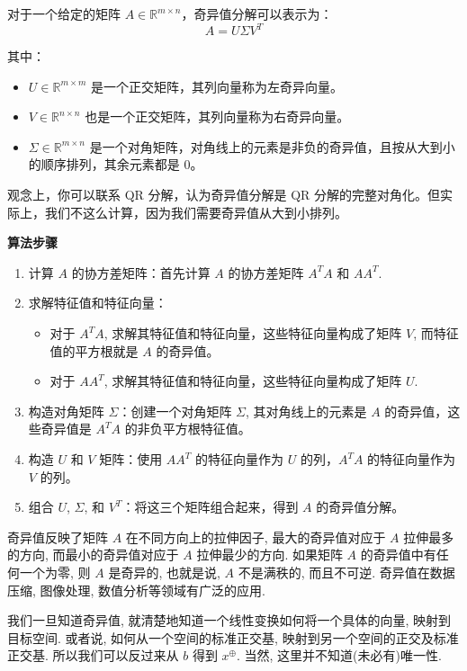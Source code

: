 \documentclass[a4paper]{ctexart}
\begin{document}
{对于一个给定的矩阵 \( A \in \mathbb{R}^{m \times n} \)，奇异值分解可以表示为：
\[ 
  A = U \Sigma V^T 
\]

其中：
\begin{itemize}
  \item \( U \in \mathbb{R}^{m \times m} \) 是一个正交矩阵，其列向量称为左奇异向量。
  \item \( V \in \mathbb{R}^{n \times n} \) 也是一个正交矩阵，其列向量称为右奇异向量。
  \item \( \Sigma \in \mathbb{R}^{m \times n} \) 是一个对角矩阵，对角线上的元素是非负的奇异值，且按从大到小的顺序排列，其余元素都是 $0$。
\end{itemize}

观念上，你可以联系 QR 分解，认为奇异值分解是 QR 分解的完整对角化。但实际上，我们不这么计算，因为我们需要奇异值从大到小排列。

\noindent \textbf{算法步骤}
\begin{enumerate}
  \item 计算 \( A \) 的协方差矩阵：首先计算 \( A \) 的协方差矩阵 \( A^T A \) 和 \( A A^T \).
  \item 求解特征值和特征向量：
    \begin{itemize}
      \item  对于 \( A^T A \), 求解其特征值和特征向量，这些特征向量构成了矩阵 \( V \), 而特征值的平方根就是 \( A \) 的奇异值。
      \item 对于 \( A A^T \), 求解其特征值和特征向量，这些特征向量构成了矩阵 \( U \).
    \end{itemize}
  \item 构造对角矩阵 \( \Sigma \)：创建一个对角矩阵 \( \Sigma \), 其对角线上的元素是 \( A \) 的奇异值，这些奇异值是 \( A^T A \) 的非负平方根特征值。
  \item 构造 \( U \) 和 \( V \) 矩阵：使用 \( A A^T \) 的特征向量作为 \( U \) 的列，\( A^T A \) 的特征向量作为 \( V \) 的列。
  \item 组合 \( U \), \( \Sigma \), 和 \( V^T \)：将这三个矩阵组合起来，得到 \( A \) 的奇异值分解。
\end{enumerate}

奇异值反映了矩阵 $A$ 在不同方向上的拉伸因子, 最大的奇异值对应于 $A$ 拉伸最多的方向, 
而最小的奇异值对应于 $A$ 拉伸最少的方向. 如果矩阵 $A$ 的奇异值中有任何一个为零, 
则 $A$ 是奇异的, 也就是说, $A$ 不是满秩的, 而且不可逆. 奇异值在数据压缩, 
图像处理, 数值分析等领域有广泛的应用. 

我们一旦知道奇异值, 就清楚地知道一个线性变换如何将一个具体的向量, 映射到目标空间. 或者说, 
如何从一个空间的标准正交基, 映射到另一个空间的正交及标准正交基.
所以我们可以反过来从 $b$ 得到 $x^{\oplus}$. 当然, 这里并不知道(未必有)唯一性. 

}
\end{document}
